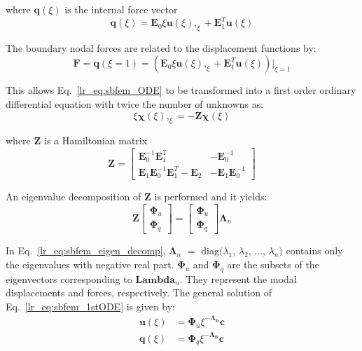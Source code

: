 where $\mathbf{q}(\xi)$ is the internal force vector
\begin{equation}
    \mathbf{q}(\xi) =   \mathbf{E}_0 \xi \mathbf{u}(\xi),_{\xi} +
                        \mathbf{E}_1^T \mathbf{u}(\xi)
    \label{lr_eq:sbfem_internal_force}
\end{equation}

The boundary nodal forces are related to the displacement functions by:
\begin{equation}
    \mathbf{F} = \mathbf{q}(\xi=1) = (\mathbf{E}_0\xi \mathbf{u}(\xi),_{\xi} + \mathbf{E}_1^T\mathbf{u}(\xi))|_{\xi=1}
    \label{lr_eq:sbfem_boundary_nodal_force}
\end{equation}

This allows Eq.~\ref{lr_eq:sbfem_ODE} to be transformed into a first order ordinary differential equation with twice the number of unknowns as:
\begin{equation}
    \xi \mathbf{\chi}(\xi),_{\xi} = -\mathbf{Z} \mathbf{\chi}(\xi)
    \label{lr_eq:sbfem_1stODE}
\end{equation}

where $\mathbf{Z}$ is a Hamiltonian matrix
\begin{equation}
    \mathbf{Z} = \begin{bmatrix}
        \mathbf{E}_0^{-1} \mathbf{E}_1^T    &  -\mathbf{E}_0^{-1}   \\
        \mathbf{E}_1 \mathbf{E}_0^{-1} \mathbf{E}_1^T - \mathbf{E}_2    &   -\mathbf{E}_1 \mathbf{E}_0^{-1}
    \end{bmatrix}
    \label{lr_eq:sbfem_zmatrix}
\end{equation}

An eigenvalue decomposition of $\mathbf{Z}$ is performed and it yields:
\begin{equation}
    \mathbf{Z} \begin{bmatrix}
        \mathbf{\Phi}_u \\
        \mathbf{\Phi}_q
    \end{bmatrix} = \begin{bmatrix}
        \mathbf{\Phi}_u  \\
        \mathbf{\Phi}_q
    \end{bmatrix} \mathbf{\Lambda}_n
    \label{lr_eq:sbfem_eigen_decomp}
\end{equation}

In Eq.~\ref{lr_eq:sbfem_eigen_decomp}, $\mathbf{\Lambda}_n$ $=$ diag$(\lambda_1$, $\lambda_2$, $\dots$, $\lambda_n)$ contains only the eigenvalues with negative real part.
$\mathbf{\Phi}_u$ and $\mathbf{\Phi}_q$ are the subsets of the eigenvectors corresponding to $\mathbf{Lambda}_n$.
They represent the modal displacements and forces, respectively.
The general solution of Eq.~\ref{lr_eq:sbfem_1stODE} is given by:
\begin{align}
    \mathbf{u}(\xi) &= \mathbf{\Phi}_u \xi^{-\mathbf{\Lambda_n}} \mathbf{c}
    \label{lr_eq:sbfem_general_sol_disp} \\
    \mathbf{q}(\xi) &= \mathbf{\Phi}_q \xi^{-\mathbf{\Lambda_n}} \mathbf{c}
    \label{lr_eq:sbfem_general_sol_str}
\end{align}

